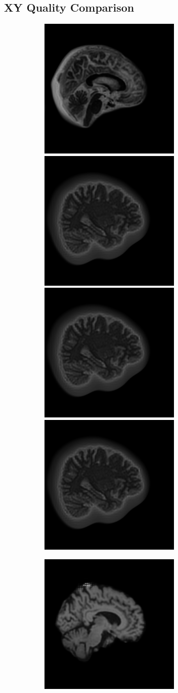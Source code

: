 \documentclass[12pt, fleqn, titlepage]{article}
\newcommand\skipper{1.4pt}
\newcommand\ripper{2.5pt}
\begin{document}
\subsection{XY Quality Comparison}\label{xy_generated}
\begin{figure}[H]
	\centering
	\begin{subfigure}[b]{0.7\textwidth}
		\centering
		\includegraphics[width=0.22\linewidth]{imgs/1.5T_bilinear}
		\hskip\skipper
		\includegraphics[width=0.22\linewidth]{imgs/3T_bilinear}
		\hskip\skipper
		\includegraphics[width=0.22\linewidth]{imgs/3T_bilinear}
		\hskip\skipper
		\includegraphics[width=0.22\linewidth]{imgs/3T_bilinear}
	\end{subfigure}
	\vskip\ripper
	\begin{subfigure}[b]{0.7\textwidth}
		\centering
		\includegraphics[width=0.22\linewidth]{imgs/1.5T_no_noise}

\end{subfigure}
\end{figure}
\end{document}
